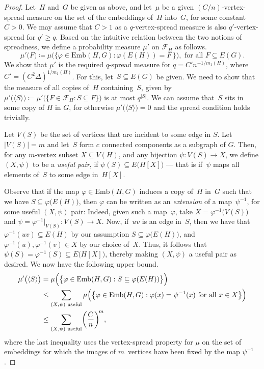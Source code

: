 \documentclass[final]{article}
\theoremstyle{definition}
\newcommand{\Emb}{\mathrm{Emb}}
\begin{document}
\begin{proof}
    Let~$H$ and~$G$ be given as above, and let~$\mu$ be a given $(C/n)$-vertex-spread measure on the set of the embeddings of~$H$ into~$G$, for some constant $C > 0$. We may assume that $C > 1$ as a $q$-vertex-spread measure is also $q'$-vertex-spread for $q' \geq q$.  Based on the intuitive relation between the two notions of spreadness, we define a probability measure $\mu'$ on $\mathcal{F}_H$ as follows. 
    $$\mu'\!\bigl(F\bigr) \coloneqq  \mu\bigl(\{ \varphi \in \Emb(H,G) : \varphi(E(H)) = F\, \}\bigr), \text{ for all $F \subseteq E(G)$.}$$
    \indent We show that $\mu'$ is the required $q$-spread measure for $q = C'n^{-1/m_1(H)}$, where $C' = (C^2\Delta)^{1/m_1(H)}$. For this, let~$S \subseteq E(G)$ be given. We need to show that the measure of all copies of~$H$ containing~$S$, given by $\mu'\bigl(\langle S\rangle\bigr) \coloneqq \mu'\bigl(\{F \in \mathcal{F}_H : S \subseteq F\}\bigr)$ is at most $q^{|S|}$. We can assume that~$S$ sits in some copy of $H$ in $G$, for otherwise $\mu'\bigl(\langle S \rangle\bigr) = 0$ and the spread condition holds trivially.  
    
    Let $V(S)$ be the set of vertices that are incident to some edge in $S$. Let $|V(S)| = m$ and let~$S$ form $c$ connected components as a subgraph of $G$. Then, for any $m$-vertex subset $X \subseteq V(H)$, and any bijection $\psi : V(S) \to X$, we define $(X, \psi)$ to be a \emph{useful pair}, if $\psi(S) \subseteq E\bigl(H[X]\bigr)$ --- that is if~$\psi$ maps all elements of~$S$ to some edge in~$H[X]$. 
    
    Observe that if the map $\varphi \in \Emb(H,G)$ induces a copy of~$H$ in~$G$ such that we have $S \subseteq \varphi\bigl(E(H)\bigr)$, then $\varphi$ can be written as an \emph{extension} of a map~$\psi^{-1}$, for some useful $(X, \psi)$ pair: Indeed, given such a map~$\varphi$, take $X = \varphi^{-1}\bigl(V(S)\bigr)$ and $\psi = \varphi^{-1}\big|_{V(S)} : V(S) \to X$. Now, if~$uv$ is an edge in~$S$, then we have that $\varphi^{-1}(uv) \subseteq E(H)$ by our assumption $S \subseteq \varphi\bigl(E(H)\bigr)$, and $\varphi^{-1}(u), \varphi^{-1}(v) \in X$ by our choice of~$X$. Thus, it follows that $\psi(S) = \varphi^{-1}(S) \subseteq E\bigl(H[X]\bigr)$, thereby making $(X, \psi)$ a useful pair as desired. We now have the following upper bound.
    \begin{equation*}
        \begin{split}
            \mu'\bigl(\langle S \rangle\bigr) &= \mu \Bigl(\bigl\{ \varphi \in \Emb(H,G) : S \subseteq \varphi(E(H)) \bigr\}\Bigr)\\
            &\leq \sum_{(X, \psi) \text{ useful}} \mu\Bigl( \bigl\{ \varphi \in \Emb(H,G) : \varphi(x) = \psi^{-1}(x) \text{ for all } x \in X \bigr\}\Bigr)\\ 
            &\leq \sum_{(X, \psi) \text{ useful}} \biggl(\frac{C}{n}\biggr)^{\!m},
        \end{split}
    \end{equation*}
    where the last inequality uses the vertex-spread property for $\mu$ on the set of embeddings for which the images of $m$~vertices have been fixed by the map $\psi^{-1}$. 
    

\end{proof}
\end{document}
